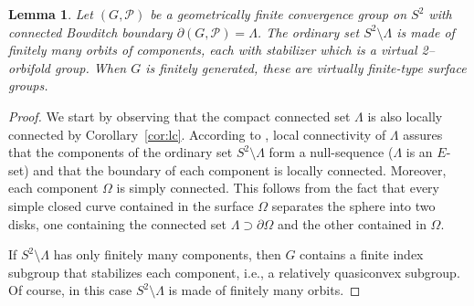 \documentclass[11pt]{article}
\newtheorem{lemma}[theorem]{Lemma}
\theoremstyle{definition}
\newcommand\PP{\mathcal{P}}
\begin{document}
\begin{lemma}\label{lma:omegafuchs} Let $(G,\PP)$ be a geometrically finite convergence group on $S^2$ with connected Bowditch boundary $\partial(G, \PP) = \Lambda$.
The ordinary set $S^2\setminus\Lambda$ is made of finitely many orbits of components, each with stabilizer which is a virtual 2--orbifold group. When $G$ is finitely generated, these are virtually finite-type surface groups.  
\end{lemma}



\begin{proof} 
We start by observing that the compact connected set $\Lambda$ is also locally connected by Corollary~\ref{cor:lc}. According to \cite[Theorem VI.4.4, p. 113]{whyburnantop}, local connectivity of $\Lambda$ assures that the components of the ordinary set $S^2\setminus\Lambda$ form a null-sequence ($\Lambda$ is an $E$-set) and that the boundary of each component is locally connected.
Moreover, each component $\Omega$ is simply connected. This follows from the fact that every simple closed curve contained in the surface $\Omega$ separates the sphere into two disks, one containing the connected set $\Lambda\supset \partial\Omega$ and the other contained in $\Omega$. 

If $S^2\setminus\Lambda$ has only finitely many components, then $G$ contains a finite index subgroup that stabilizes each component, i.e., a relatively quasiconvex subgroup. Of course, in this case $S^2\setminus\Lambda$ is made of finitely many orbits.


\end{proof}
\end{document}
